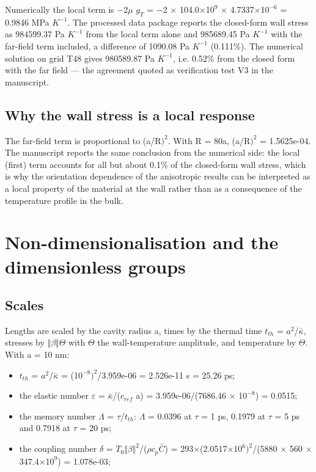 \documentclass[preprint,12pt]{elsarticle}
\begin{document}
Numerically the local term is $-$2$\mu$ $g_{T}$ = $-$2 $\times$ 104.0$\times$1$0^{9}$ $\times$ 4.7337$\times$1$0^{-6}$ = 0.9846 MPa $K^{-1}$. The processed data package reports the closed-form wall stress as 984599.37 Pa $K^{-1}$ from the local term alone and 985689.45 Pa $K^{-1}$ with the far-field term included, a difference of 1090.08 Pa $K^{-1}$ (0.111\%). The numerical solution on grid T48 gives 980589.87 Pa $K^{-1}$, i.e. 0.52\% from the closed form with the far field --- the agreement quoted as verification test V3 in the manuscript.

\subsection{Why the wall stress is a local response}
\label{sec:4.3}

The far-field term is proportional to (a/R$)^{2}$. With R = 80a, (a/R$)^{2}$ = 1.5625e-04. The manuscript reports the same conclusion from the numerical side: the local (first) term accounts for all but about 0.1\% of the closed-form wall stress, which is why the orientation dependence of the anisotropic results can be interpreted as a local property of the material at the wall rather than as a consequence of the temperature profile in the bulk.

\section{Non-dimensionalisation and the dimensionless groups}
\label{sec:5}

\subsection{Scales}
\label{sec:5.1}

Lengths are scaled by the cavity radius a, times by the thermal time $t_{th}$ = $a^{2}$/$\bar{\kappa}$, stresses by $\Vert \beta \Vert \Theta$ with $\Theta$ the wall-temperature amplitude, and temperature by $\Theta$. With a = 10 nm:

\begin{itemize}
\item $t_{th}$ = $a^{2}$/$\bar{\kappa}$ = (1$0^{-8})^{2}$/3.959e-06 = 2.526e-11 s = 25.26 ps;
\item the elastic number $\varepsilon$ = $\bar{\kappa}$/($c_{ref}$ a) = 3.959e-06/(7686.46 $\times$ 1$0^{-8}$) = 0.0515;
\item the memory number $\Lambda$ = $\tau$/$t_{th}$: $\Lambda$ = 0.0396 at $\tau$ = 1 ps, 0.1979 at $\tau$ = 5 ps and 0.7918 at $\tau$ = 20 ps;
\item the coupling number $\delta$ = $T_{0}\Vert \beta \Vert ^{2}$/($\rho c_{p}\bar{C}$) = 293$\times$(2.0517$\times$1$0^{6})^{2}$/(5880 $\times$ 560 $\times$ 347.4$\times$1$0^{9}$) = 1.078e-03;
\end{itemize}
\end{document}
